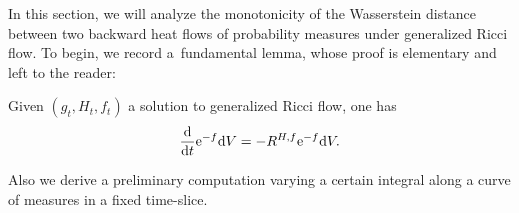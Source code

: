 In this section, we will analyze the monotonicity of the Wasserstein distance between two backward heat flows of probability measures under generalized Ricci flow. To begin, we record a~fundamental lemma, whose proof is elementary and left to the reader:

\begin{Lemma} \label{l:volumeev} Given $(g_t, H_t, f_t)$ a solution to generalized Ricci flow, one has
\begin{align*}
 \frac{{\rm d}}{{\rm d}t} {\rm e}^{-f} {\rm d}V = - R^{H,f} {\rm e}^{-f} {\rm d}V.
\end{align*}
\end{Lemma}

Also we derive a preliminary computation varying a certain integral along a curve of measures in a fixed time-slice.

